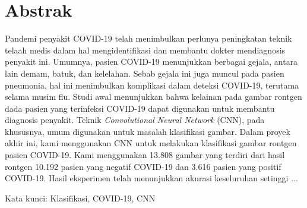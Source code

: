 %
%


%

\chapter*{Abstrak}

\vspace*{0.2cm}
{
Pandemi penyakit COVID-19 telah menimbulkan perlunya peningkatan teknik telaah medis dalam hal mengidentifikasi dan membantu dokter mendiagnosis penyakit ini. Umumnya, pasien COVID-19 menunjukkan berbagai gejala, antara lain demam, batuk, dan kelelahan. Sebab gejala ini juga muncul pada pasien pneumonia, hal ini menimbulkan komplikasi dalam deteksi COVID-19, terutama selama musim flu. Studi awal menunjukkan bahwa kelainan pada gambar rontgen dada pasien yang terinfeksi COVID-19 dapat digunakan untuk membantu diagnosis penyakit. Teknik \textit{Convolutional Neural Network} (CNN), pada khususnya, umum digunakan untuk masalah klasifikasi gambar. Dalam proyek akhir ini, kami menggunakan CNN untuk melakukan klasifikasi gambar rontgen pasien COVID-19. Kami menggunakan 13.808 gambar yang terdiri dari hasil rontgen 10.192 pasien yang negatif COVID-19 dan 3.616 pasien yang positif COVID-19. Hasil eksperimen telah menunjukkan akurasi keseluruhan setinggi ... 


	\bigskip

	Kata kunci: Klasifikasi, COVID-19, CNN
}

\newpage